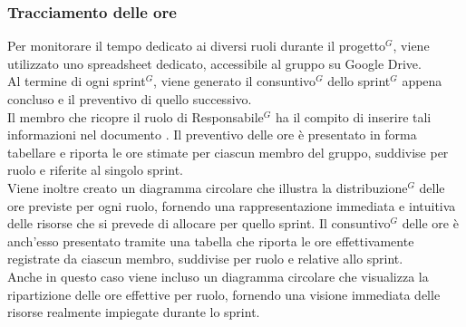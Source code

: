 \subsubsection{Tracciamento delle ore}
Per monitorare il tempo dedicato ai diversi ruoli durante il progetto$^G$, viene utilizzato uno spreadsheet dedicato, accessibile al gruppo su Google Drive.\\
Al termine di ogni sprint$^G$, viene generato il consuntivo$^G$ dello sprint$^G$ appena concluso e il preventivo di quello successivo. \\
Il membro che ricopre il ruolo di Responsabile$^G$ ha il compito di inserire tali informazioni nel documento .
Il preventivo delle ore è presentato in forma tabellare e riporta le ore stimate per ciascun membro del gruppo, suddivise per ruolo e riferite al singolo sprint.\\
Viene inoltre creato un diagramma circolare che illustra la distribuzione$^G$ delle ore previste per ogni ruolo, fornendo una rappresentazione immediata e intuitiva delle risorse che si prevede di allocare per quello sprint.
Il consuntivo$^G$ delle ore è anch’esso presentato tramite una tabella che riporta le ore effettivamente registrate da ciascun membro, suddivise per ruolo e relative allo sprint.\\ 
Anche in questo caso viene incluso un diagramma circolare che visualizza la ripartizione delle ore effettive per ruolo, fornendo una visione immediata delle risorse realmente impiegate durante lo sprint.

